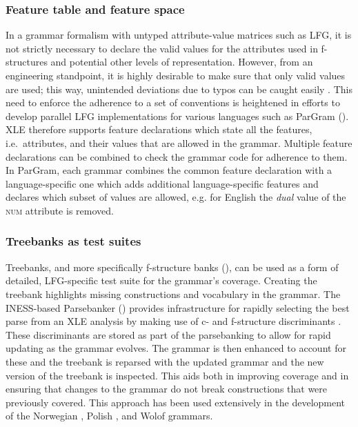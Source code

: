 \documentclass[output=paper,hidelinks]{langscibook}
\begin{document}
\subsubsection{Feature table and feature space}  In a grammar formalism with untyped attri\-bute-value matrices such as LFG, it is not strictly necessary to declare the valid values for the attributes used in f-structures and potential other levels of representation. However, from an engineering standpoint, it is highly desirable to make sure that only valid values are used; this way, unintended deviations due to typos can be caught easily \citep{crouchking08}. This need to enforce the adherence to a set of conventions is heightened in efforts to develop parallel LFG implementations for various languages such as ParGram (). XLE therefore supports feature declarations which state all the features, i.e.\ attributes, and their values that are allowed in the grammar. Multiple feature declarations can be combined to check the  grammar code for adherence to them. In ParGram, each grammar combines the common feature declaration with a  language-specific one which adds additional language-specific features and declares which subset of values are allowed, e.g. for English the {\em dual}\/ value of the \textsc{num} attribute is removed.
        
\subsubsection{Treebanks as test suites} Treebanks, and more specifically f-structure banks (), can be used as a form of detailed, LFG-specific test suite for the grammar's coverage. Creating the treebank highlights missing constructions and vocabulary in the grammar. The INESS-based Parsebanker () provides infrastructure for rapidly selecting the best parse from an XLE analysis by making use of c- and f-structure discriminants \citep{Rosen07lfg}. These discriminants are stored as part of the parsebanking to allow for rapid updating as the grammar evolves.  The grammar is then enhanced to account for these and the treebank is reparsed with the updated grammar and the new version of the treebank is inspected. This aids both in improving coverage and in ensuring that changes to the grammar do not break constructions that were previously covered. This approach has been used extensively in the development of the Norwegian \citep{dyvikEtAl2016}, Polish \citep{patprz12}, and Wolof \citep{Dione:Disambiguation} grammars.
        
\end{document}
